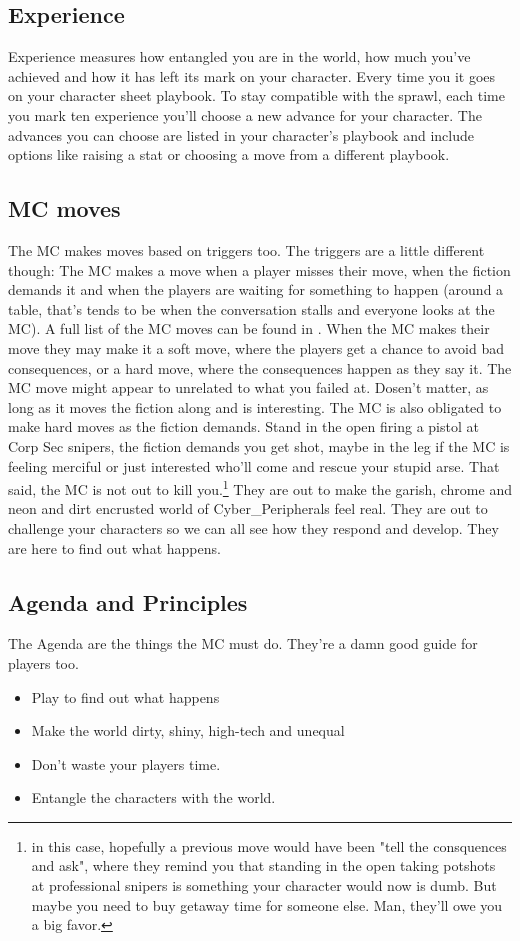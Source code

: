 \documentclass{tufte-book}
\begin{document}
\subsection{Experience} \label{sec: experience}
Experience measures how entangled you are in the world, how much you've achieved and how it has left its mark on your character. Every time you  it goes on your character sheet playbook. To stay compatible with the sprawl, each time you mark ten experience you'll choose a new advance for your character. The advances you can choose are listed in your character's playbook and include options like raising a stat or choosing a move from a different playbook.

\subsection{MC moves} \label{sec: intro MC Moves}
The MC makes moves based on triggers too. The triggers are a little different though: The MC makes a move when a player misses their move, when the fiction demands it and when the players are waiting for something to happen (around a table, that's tends to be when the conversation stalls and everyone looks at the MC). A full list of the MC moves can be found in . When the MC makes their move they may make it a soft move, where the players get a chance to avoid bad consequences, or a hard move, where the consequences happen as they say it. The MC move might appear to unrelated to what you failed at. Dosen't matter, as long as it moves the fiction along and is interesting.
The MC is also obligated to make hard moves as the fiction demands. Stand in the open firing a pistol at Corp Sec snipers, the fiction demands you get shot, maybe in the leg if the MC is feeling merciful or just interested who'll come and rescue your stupid arse. That said, the MC is not out to kill you.\footnote{in this case, hopefully a previous move would have been "tell the consquences and ask", where they remind you that standing in the open taking potshots at professional snipers is something your character would now is dumb. But maybe you need to buy getaway time for someone else. Man, they'll owe you a big favor.} They are out to make the garish, chrome and neon and dirt encrusted world of Cyber\_Peripherals feel real. They are out to challenge your characters so we can all see how they respond and develop. They are here to find out what happens.

\subsection{Agenda and Principles} \label{sec: intro agenda and princ}
The Agenda are the things the MC must do. They're a damn good guide for players too.
\begin{itemize}
	\item Play to find out what happens
	\item Make the world dirty, shiny, high-tech and unequal
	\item Don't waste your players time.
	\item Entangle the characters with the world.
\end{itemize}
\end{document}
